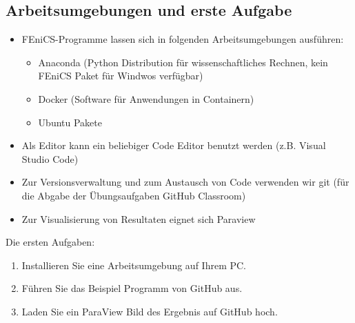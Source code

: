 \documentclass[a4paper, 12pt]{scrartcl}
\begin{document}
\subsection{Arbeitsumgebungen und erste Aufgabe}
\begin{itemize}
	\item FEniCS-Programme lassen sich in folgenden Arbeitsumgebungen ausführen:
	\begin{itemize}
		\item Anaconda (Python Distribution für wissenschaftliches Rechnen, kein FEniCS Paket für Windwos verfügbar)
		\item Docker (Software für Anwendungen in Containern)
		\item Ubuntu Pakete
	\end{itemize}
	\item Als Editor kann ein beliebiger Code Editor benutzt werden (z.B. Visual Studio Code)
	\item Zur Versionsverwaltung und zum Austausch von Code verwenden wir git (für die Abgabe der Übungsaufgaben GitHub Classroom)
	\item Zur Visualisierung von Resultaten eignet sich Paraview
\end{itemize}
Die ersten Aufgaben:
\begin{enumerate}
	\item Installieren Sie eine Arbeitsumgebung auf Ihrem PC.
	\item Führen Sie das Beispiel Programm von GitHub aus.
	\item Laden Sie ein ParaView Bild des Ergebnis auf GitHub hoch.
\end{enumerate}




\end{document}
